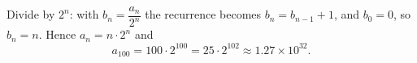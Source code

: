 Divide by $2^n$: with $b_n=\dfrac{a_n}{2^n}$ the recurrence becomes $b_n=b_{n-1}+1$, and $b_0=0$, so $b_n=n$. Hence $a_n=n\cdot2^n$ and
\[
a_{100}=\boxed{100\cdot2^{100}}=25\cdot2^{102}\approx1.27\times10^{32}.
\]
